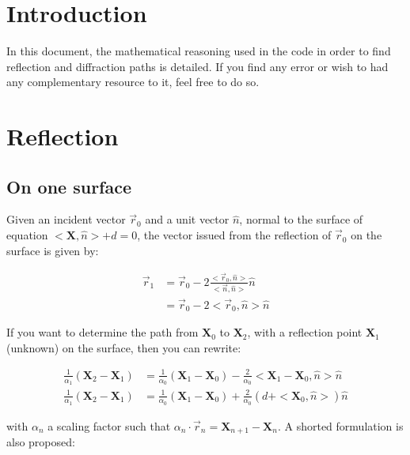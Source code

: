 \documentclass[french,10pt]{article}
\begin{document}
\setcounter{page}{0}


\newpage

\section{Introduction}

    In this document, the mathematical reasoning used in the code in order to find reflection and diffraction paths is detailed. If you find any error or wish to had any complementary resource to it, feel free to do so.

\section{Reflection}

    \subsection{On one surface}

    Given an incident vector $\vec{r}_0$ and a unit vector $\hat{n}$, normal to the surface of equation $<\pmb{X},\hat{n}> + d = 0$, the vector issued from the reflection of $\vec{r}_0$ on the surface is given by:

    \begin{align}
        \vec{r}_1 &= \vec{r}_0 - 2 \frac{<\vec{r}_0,\hat{n}>}{<\vec{n},\hat{n}>} \hat{n}\\
        &= \vec{r}_0 - 2 <\vec{r}_0,\hat{n}> \hat{n}
    \end{align}

    If you want to determine the path from $\pmb{X}_0$ to $\pmb{X}_2$, with a reflection point $\pmb{X}_1$ (unknown) on the surface, then you can rewrite:

    \begin{align}
        \frac{1}{\alpha_1}\left(\pmb{X}_2 - \pmb{X}_1 \right) &= \frac{1}{\alpha_0}\left(\pmb{X}_1 - \pmb{X}_0 \right) - \frac{2}{\alpha_0}<\pmb{X}_1 - \pmb{X}_0, \hat{n} > \hat{n}\\
        \frac{1}{\alpha_1}\left(\pmb{X}_2 - \pmb{X}_1 \right) &= \frac{1}{\alpha_0}\left(\pmb{X}_1 - \pmb{X}_0 \right) + \frac{2}{\alpha_0}\left(d + <\pmb{X}_0, \hat{n} > \right)\hat{n}
    \end{align}

    with $\alpha_n$ a scaling factor such that $\alpha_n \cdot \vec{r}_{n} = \pmb{X}_{n+1} - \pmb{X}_n$. A shorted formulation is also proposed:\\
\end{document}

